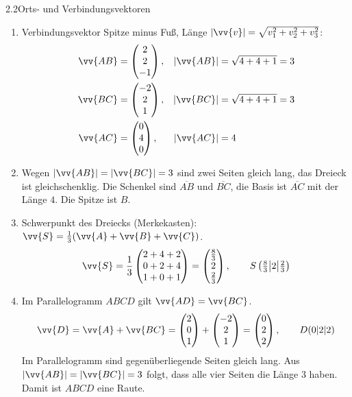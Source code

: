 \begin{loesung}{2.2}{Orts- und Verbindungsvektoren}
\begin{enumerate}[label=\alph*)]
  \item Verbindungsvektor \glqq Spitze minus Fuß\grqq, Länge $|\vv{v}| = \sqrt{v_1^2+v_2^2+v_3^2}$:
  \begin{align*}
    \vv{AB} &= \begin{pmatrix} 2\\ 2\\ -1\end{pmatrix}, & |\vv{AB}| &= \sqrt{4+4+1} = 3\\
    \vv{BC} &= \begin{pmatrix} -2\\ 2\\ 1\end{pmatrix}, & |\vv{BC}| &= \sqrt{4+4+1} = 3\\
    \vv{AC} &= \begin{pmatrix} 0\\ 4\\ 0\end{pmatrix}, & |\vv{AC}| &= 4
  \end{align*}
  \item Wegen $|\vv{AB}| = |\vv{BC}| = 3$ sind zwei Seiten gleich lang, das Dreieck ist gleichschenklig. Die Schenkel sind $\overline{AB}$ und $\overline{BC}$, die Basis ist $\overline{AC}$ mit der Länge $4$. Die Spitze ist $B$.
  \item Schwerpunkt des Dreiecks (Merkekasten): $\vv{S} = \frac{1}{3}(\vv{A}+\vv{B}+\vv{C})$.
  \[\vv{S} = \dfrac{1}{3}\begin{pmatrix} 2+4+2\\ 0+2+4\\ 1+0+1\end{pmatrix} = \begin{pmatrix} \frac{8}{3}\\ 2\\ \frac{2}{3}\end{pmatrix},\qquad S\left(\tfrac{8}{3}\big|2\big|\tfrac{2}{3}\right)\]
  \item Im Parallelogramm $ABCD$ gilt $\vv{AD} = \vv{BC}$.
  \[\vv{D} = \vv{A}+\vv{BC} = \begin{pmatrix} 2\\ 0\\ 1\end{pmatrix}+\begin{pmatrix} -2\\ 2\\ 1\end{pmatrix} = \begin{pmatrix} 0\\ 2\\ 2\end{pmatrix},\qquad D(0|2|2)\]
  Im Parallelogramm sind gegenüberliegende Seiten gleich lang. Aus $|\vv{AB}| = |\vv{BC}| = 3$ folgt, dass alle vier Seiten die Länge $3$ haben. Damit ist $ABCD$ eine Raute.
\end{enumerate}
\end{loesung}

